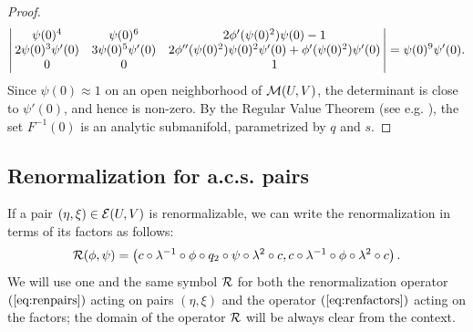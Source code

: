 \begin{proof}
\begin{equation}
\left| \! \!
\begin{array}{c c c}
\psi(0)^{4}   &  \psi(0)^{6} &  2 \phi'(\psi(0)^2) \psi(0)-1   \\
 2 \psi(0)^{3}  \psi'(0)  &   3 \psi(0)^{5} \psi'(0)  &   2 \phi''(\psi(0)^2) \psi(0)^{2} \psi'(0)+ \phi'(\psi(0)^2) \psi'(0) \\
 0  &   0  &  1
\end{array}
\! \! \right|=\psi(0)^{9} \psi'(0).
\end{equation}
Since $\psi(0)\approx 1$ on an open neighborhood of $\mathcal{M}(U,V)$, the determinant is close to $\psi'(0)$, and hence is non-zero.
By the Regular Value Theorem (see e.g. \cite{ArBo}), the set $F^{-1}(0)$ is an analytic submanifold, parametrized by $q$ and $s$. 

\end{proof}



\subsection{Renormalization for a.c.s. pairs}\label{sec:RenACFM}

If a pair $(\eta,\xi)\in\mathcal{E}(U,V)$ is renormalizable, we can write the renormalization in terms of its factors as follows:
\begin{equation}
\label{eq:renfactors}\mathcal{R}(\phi,\psi)=\left(c \circ \lambda^{-1} \circ \phi \circ q_2 \circ \psi \circ \lambda^2 \circ c  ,  c \circ \lambda^{-1} \circ \phi \circ \lambda^2 \circ c \right).
\end{equation}
We will use one and the same symbol $\mathcal{R}$ for both the renormalization operator $(\ref{eq:renpairs})$  acting on pairs $(\eta,\xi)$ and the operator $(\ref{eq:renfactors})$ acting on the factors; the domain of the operator $\mathcal{R}$ will be always clear from the context.





